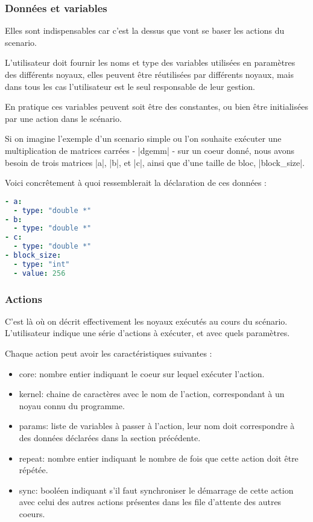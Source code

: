 \subsubsection{Données et variables}

Elles sont indispensables car c'est la dessus que vont se baser les actions du scenario.

L'utilisateur doit fournir les noms et type des variables utilisées en paramètres des différents noyaux, elles peuvent être réutilisées par différents noyaux, mais dans tous les cas l'utilisateur est le seul responsable de leur gestion.

En pratique ces variables peuvent soit être des constantes, ou bien être initialisées par une action dans le scénario.

Si on imagine l'exemple d'un scenario simple ou l'on souhaite exécuter une multiplication de matrices carrées - |dgemm| - sur un coeur donné, nous avons besoin de trois matrices |a|, |b|, et |c|, ainsi que d'une taille de bloc, |block_size|.

Voici concrêtement à quoi ressemblerait la déclaration de ces données :

\begin{lstlisting}[language=yaml]
- a:
  - type: "double *"
- b:
  - type: "double *"
- c:
  - type: "double *"
- block_size:
  - type: "int"
  - value: 256
\end{lstlisting}

\subsubsection{Actions}

C'est là où on décrit effectivement les noyaux exécutés au cours du scénario.
L'utilisateur indique une série d'actions à exécuter, et avec quels paramètres.

Chaque action peut avoir les caractéristiques suivantes :
\begin{itemize}
  \item core: nombre entier indiquant le coeur sur lequel exécuter l'action.
  \item kernel: chaine de caractères avec le nom de l'action, correspondant à un noyau connu du programme.
  \item params: liste de variables à passer à l'action, leur nom doit correspondre à des données déclarées dans la section précédente.
  \item repeat: nombre entier indiquant le nombre de fois que cette action doit être répétée.
  \item sync: booléen indiquant s'il faut synchroniser le démarrage de cette action avec celui des autres actions présentes dans les file d'attente des autres coeurs.
\end{itemize}

